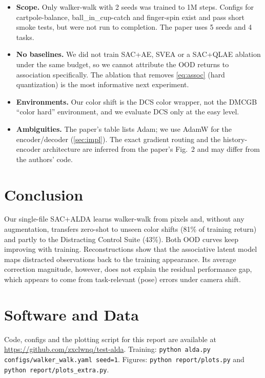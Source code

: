 \documentclass{article}
\theoremstyle{plain}
\theoremstyle{definition}
\theoremstyle{remark}
\begin{document}
\begin{itemize}
\item \textbf{Scope.} Only walker-walk with 2 seeds was trained to 1M steps.
  Configs for cartpole-balance, ball\_in\_cup-catch and finger-spin exist and
  pass short smoke tests, but were not run to completion. The paper uses 5
  seeds and 4 tasks.
\item \textbf{No baselines.} We did not train SAC+AE, SVEA or a
  SAC+QLAE ablation under the same budget, so we cannot attribute the
  OOD returns to association specifically. The ablation that removes
  \cref{eq:assoc} (hard quantization) is the most informative next experiment.
\item \textbf{Environments.} Our color shift is the DCS color wrapper, not the
  DMCGB ``color hard'' environment, and we evaluate DCS only at the easy level.
\item \textbf{Ambiguities.} The paper's table lists Adam; we use AdamW for the
  encoder/decoder (\cref{sec:impl}). The exact gradient routing and the
  history-encoder architecture are inferred from the paper's Fig.~2 and may
  differ from the authors' code.
\end{itemize}

\section{Conclusion}

Our single-file SAC+ALDA learns walker-walk from pixels and, without
any augmentation, transfers zero-shot to unseen color shifts (81\% of training
return) and partly to the Distracting Control Suite (43\%). Both OOD curves
keep improving with training. Reconstructions show that the associative
latent model maps distracted observations back to the training appearance.
Its average correction magnitude, however, does not explain the residual
performance gap, which appears to come from task-relevant (pose) errors under
camera shift.

\section*{Software and Data}

Code, configs and the plotting script for this report are available at
\url{https://github.com/zxclwnq/test-alda}. Training:
\texttt{python alda.py configs/walker\_walk.yaml seed=1}. Figures:
\texttt{python report/plots.py} and \texttt{python report/plots\_extra.py}.
\end{document}
